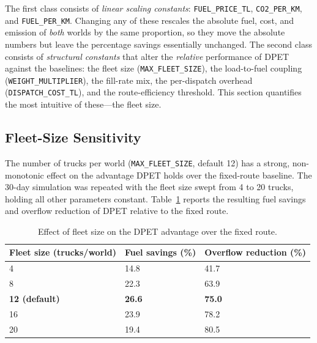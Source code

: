 \indent The first class consists of \textit{linear scaling constants}: \texttt{FUEL\_PRICE\_TL}, \texttt{CO2\_PER\_KM}, and \texttt{FUEL\_PER\_KM}. Changing any of these rescales the absolute fuel, cost, and emission of \textit{both} worlds by the same proportion, so they move the absolute numbers but leave the percentage savings essentially unchanged. The second class consists of \textit{structural constants} that alter the \textit{relative} performance of DPET against the baselines: the fleet size (\texttt{MAX\_FLEET\_SIZE}), the load-to-fuel coupling (\texttt{WEIGHT\_MULTIPLIER}), the fill-rate mix, the per-dispatch overhead (\texttt{DISPATCH\_COST\_TL}), and the route-efficiency threshold. This section quantifies the most intuitive of these---the fleet size.

\subsection{Fleet-Size Sensitivity}
\label{sec:fleet_sensitivity}

\indent The number of trucks per world (\texttt{MAX\_FLEET\_SIZE}, default 12) has a strong, non-monotonic effect on the advantage DPET holds over the fixed-route baseline. The 30-day simulation was repeated with the fleet size swept from 4 to 20 trucks, holding all other parameters constant. Table~\ref{tab:fleet_sensitivity} reports the resulting fuel savings and overflow reduction of DPET relative to the fixed route.

\begin{table}[H]
\centering
\caption{Effect of fleet size on the DPET advantage over the fixed route.}
\label{tab:fleet_sensitivity}
\begin{tabular}{lll}
\toprule
\textbf{Fleet size (trucks/world)} & \textbf{Fuel savings (\%)} & \textbf{Overflow reduction (\%)} \\
\midrule
4   & 14.8 & 41.7 \\
8   & 22.3 & 63.9 \\
\textbf{12 (default)} & \textbf{26.6} & \textbf{75.0} \\
16  & 23.9 & 78.2 \\
20  & 19.4 & 80.5 \\
\bottomrule
\end{tabular}
\end{table}

